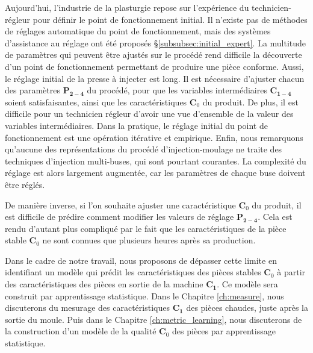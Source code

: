 Aujourd'hui, l'industrie de la plasturgie repose sur l'expérience du technicien-régleur pour définir le point de fonctionnement initial.
Il n'existe pas de méthodes de réglages automatique du point de fonctionnement, mais des systèmes d'assistance au réglage ont été proposés §\ref{subsubsec:initial_expert}.
La multitude de paramètres qui peuvent être ajustés sur le procédé rend difficile la découverte d'un point de fonctionnement permettant de produire une pièce conforme.
Aussi, le réglage initial de la presse à injecter est long.
Il est nécessaire d'ajuster chacun des paramètres $\boldsymbol{P_{2-4}}$ du procédé, pour que les variables intermédiaires $\boldsymbol{C_{1-4}}$ soient satisfaisantes, ainsi que les caractéristiques $\boldsymbol{C}_0$ du produit.
De plus, il est difficile pour un technicien régleur d'avoir une vue d'ensemble de la valeur des variables intermédiaires.
Dans la pratique, le réglage initial du point de fonctionnement est une opération itérative et empirique.
Enfin, nous remarquons qu'aucune des représentations du procédé d'injection-moulage ne traite des techniques d'injection multi-buses, qui sont pourtant courantes.
La complexité du réglage est alors largement augmentée, car les paramètres de chaque buse doivent être réglés.

De manière inverse, si l'on souhaite ajuster une caractéristique $\boldsymbol{C}_0$ du produit, il est difficile de prédire comment modifier les valeurs de réglage $\boldsymbol{P_{2-4}}$.
Cela est rendu d'autant plus compliqué par le fait que les caractéristiques de la pièce stable $\boldsymbol{C}_0$ ne sont connues que plusieurs heures après sa production.

Dans le cadre de notre travail, nous proposons de dépasser cette limite en identifiant un modèle qui prédit les caractéristiques des pièces stables $\boldsymbol{C}_0$ à partir des caractéristiques des pièces en sortie de la machine $\boldsymbol{C_1}$.
Ce modèle sera construit par apprentissage statistique.
Dans le Chapitre \ref{ch:measure}, nous discuterons du mesurage des caractéristiques $\boldsymbol{C_1}$ des pièces chaudes, juste après la sortie du moule.
Puis dans le Chapitre \ref{ch:metric_learning}, nous discuterons de la construction d'un modèle de la qualité $\boldsymbol{C}_0$ des pièces par apprentissage statistique.

